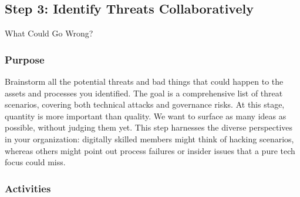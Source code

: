 \subsection{Step 3: Identify Threats Collaboratively}
\label{subsec:Step3}

What Could Go Wrong?

\subsubsection{Purpose}

Brainstorm all the potential threats and bad things that could happen to the
assets and processes you identified. The goal is a comprehensive list of threat
scenarios, covering both technical attacks and governance risks. At this
stage, quantity is more important than quality. We want to surface as many
ideas as possible, without judging them yet. This step harnesses the diverse
perspectives in your organization: digitally skilled members might think
of hacking scenarios, whereas others might point out process failures or insider
issues that a pure tech focus could miss.

\subsubsection{Activities}

